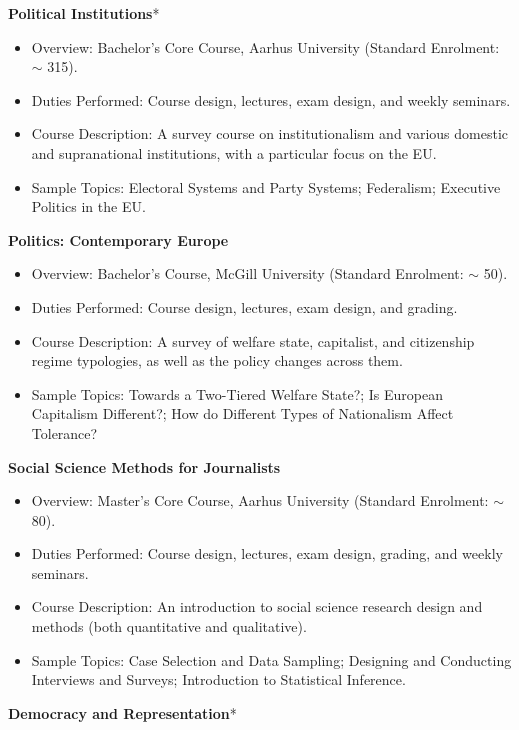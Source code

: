 \documentclass[11pt]{article}
\begin{document}
	\textbf{Political Institutions}*
	      \begin{itemize}[itemsep=0em, topsep=0em, partopsep=0em]
	      	\kern-\parskip\item Overview: Bachelor’s Core Course, Aarhus University (Standard Enrolment: $\sim$ 315).
	      	\item Duties Performed: Course design, lectures, exam design, and weekly seminars.
	      	\item Course Description: A survey course on institutionalism and various domestic and supranational institutions, with a particular focus on the EU.
	      	\item Sample Topics: Electoral Systems and Party Systems; Federalism; Executive Politics in the EU.
	      \end{itemize}
		  \textbf{Politics: Contemporary Europe}
	      \begin{itemize}[itemsep=0em, topsep=0em, partopsep=0em]
	      	\kern-\parskip\item Overview: Bachelor’s Course, McGill University (Standard Enrolment: $\sim$ 50).
	      	\item Duties Performed: Course design, lectures, exam design, and grading.
	      	\item Course Description: A survey of welfare state, capitalist, and citizenship regime typologies, as well as the policy changes across them.
	      	\item Sample Topics: Towards a Two-Tiered Welfare State?; Is European Capitalism Different?; How do Different Types of Nationalism Affect Tolerance? 
	      \end{itemize}
\textbf{Social Science Methods for Journalists}
	      \begin{itemize}[itemsep=0em, topsep=0em, partopsep=0em]
	      	\kern-\parskip\item Overview: Master’s Core Course, Aarhus University (Standard Enrolment: $\sim$ 80).
	      	\item Duties Performed: Course design, lectures, exam design, grading, and weekly seminars.
	      	\item Course Description: An introduction to social science research design and methods (both quantitative and qualitative).
	      	\item Sample Topics: Case Selection and Data Sampling; Designing and Conducting Interviews and Surveys; Introduction to Statistical Inference.
	      \end{itemize}
	\textbf{Democracy and Representation}*
\end{document}
